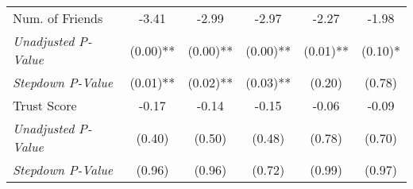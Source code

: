 \begin{tabular}{l c c c c c}
Num. of Friends & -3.41 & -2.99 & -2.97 & -2.27 & -1.98 \\
\quad \textit{Unadjusted P-Value} & (0.00)** & (0.00)** & (0.00)** & (0.01)** & (0.10)* \\
\quad \textit{Stepdown P-Value} & (0.01)** & (0.02)** & (0.03)** & (0.20) & (0.78) \\
Trust Score & -0.17 & -0.14 & -0.15 & -0.06 & -0.09 \\
\quad \textit{Unadjusted P-Value} & (0.40) & (0.50) & (0.48) & (0.78) & (0.70) \\
\quad \textit{Stepdown P-Value} & (0.96) & (0.96) & (0.72) & (0.99) & (0.97) \\
\bottomrule
\end{tabular}
